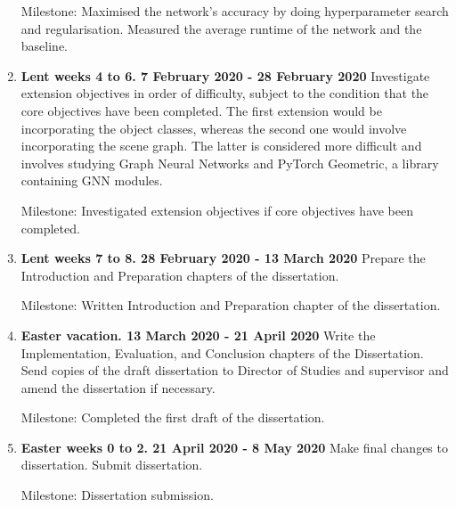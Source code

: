 \documentclass[12pt]{article}
\begin{document}
\begin{enumerate}
	Milestone: Maximised the network's accuracy by doing hyperparameter search and regularisation. Measured the average runtime of the network and the baseline.
	
	\item {\fontsize{12.5}{16} \textbf{Lent weeks 4 to 6. 7 February 2020 - 28 February 2020}} Investigate extension objectives in order of difficulty, subject to the condition that the core objectives have been completed.  The first extension would be incorporating the object classes, whereas the second one would involve incorporating the scene graph. The latter is considered more difficult and involves studying Graph Neural Networks and PyTorch Geometric, a library containing GNN modules. 
	
	Milestone: Investigated extension objectives if core objectives have been completed.
	
	\item {\fontsize{12.5}{16} \textbf{Lent weeks 7 to 8. 28 February 2020 - 13 March 2020 }} Prepare the Introduction and Preparation chapters of the dissertation.
	
	Milestone: Written Introduction and Preparation chapter of the dissertation.
	
	\item {\fontsize{12.5}{16} \textbf{Easter vacation. 13 March 2020 - 21 April 2020}} Write the Implementation, Evaluation, and Conclusion chapters of the Dissertation. Send copies of the draft dissertation to Director of Studies and supervisor and amend the dissertation if necessary.
	
	Milestone: Completed the first draft of the dissertation.
	
	\item {\fontsize{12.5}{16} \textbf{Easter weeks 0 to 2. 21 April 2020 - 8 May 2020}} Make final changes to dissertation. Submit dissertation.
	
	Milestone: Dissertation submission.
\end{enumerate}



\end{document}
